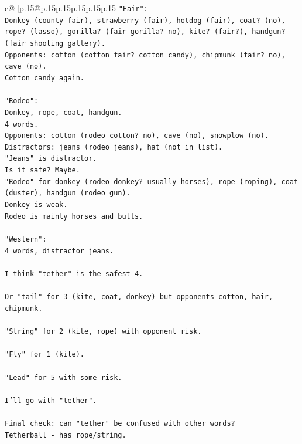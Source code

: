 \documentclass{article}
\begin{document}
{\begin{supertabular}{c@{$\;$}|p{.15\linewidth}@{}p{.15\linewidth}p{.15\linewidth}p{.15\linewidth}p{.15\linewidth}p{.15\linewidth}}
{{{\texttt{"Fair":} \\
\texttt{Donkey (county fair), strawberry (fair), hotdog (fair), coat? (no), rope? (lasso), gorilla? (fair gorilla? no), kite? (fair?), handgun? (fair shooting gallery).} \\
\texttt{Opponents: cotton (cotton fair? cotton candy), chipmunk (fair? no), cave (no).} \\
\texttt{Cotton candy again.} \\
\\ 
\texttt{"Rodeo":} \\
\texttt{Donkey, rope, coat, handgun.} \\
\texttt{4 words.} \\
\texttt{Opponents: cotton (rodeo cotton? no), cave (no), snowplow (no).} \\
\texttt{Distractors: jeans (rodeo jeans), hat (not in list).} \\
\texttt{"Jeans" is distractor.} \\
\texttt{Is it safe? Maybe.} \\
\texttt{"Rodeo" for donkey (rodeo donkey? usually horses), rope (roping), coat (duster), handgun (rodeo gun).} \\
\texttt{Donkey is weak.} \\
\texttt{Rodeo is mainly horses and bulls.} \\
\\ 
\texttt{"Western":} \\
\texttt{4 words, distractor jeans.} \\
\\ 
\texttt{I think "tether" is the safest 4.} \\
\\ 
\texttt{Or "tail" for 3 (kite, coat, donkey) but opponents cotton, hair, chipmunk.} \\
\\ 
\texttt{"String" for 2 (kite, rope) with opponent risk.} \\
\\ 
\texttt{"Fly" for 1 (kite).} \\
\\ 
\texttt{"Lead" for 5 with some risk.} \\
\\ 
\texttt{I'll go with "tether".} \\
\\ 
\texttt{Final check: can "tether" be confused with other words?} \\
\texttt{Tetherball {-} has rope/string.} \\
}}}
\end{supertabular}}
\end{document}
